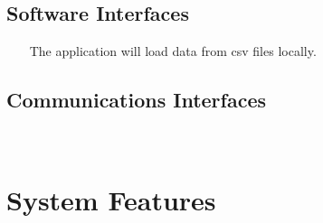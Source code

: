\documentclass{report}
\begin{document}
\section{Software Interfaces} ~~~
The application will load data from csv files locally.


\section{Communications Interfaces} ~~~

\chapter{System Features}
\end{document}
